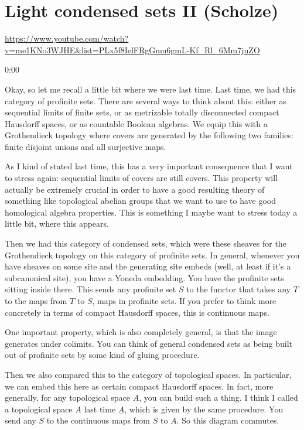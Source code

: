 
\section{\ufs Light condensed sets II (Scholze)}

\url{https://www.youtube.com/watch?v=me1KNo3WJHE&list=PLx5f8IelFRgGmu6gmL-Kf_Rl_6Mm7juZO}
\renewcommand{\yt}[2]{\href{https://www.youtube.com/watch?v=me1KNo3WJHE&list=PLx5f8IelFRgGmu6gmL-Kf_Rl_6Mm7juZO&t=#1}{#2}}
\vspace{1em}

\begin{unfinished}{0:00}

Okay, so let me recall a little bit where we were last time. Last time, we had this category of profinite sets. There are several ways to think about this: either as sequential limits of finite sets, or as metrizable totally disconnected compact Hausdorff spaces, or as countable Boolean algebras. We equip this with a Grothendieck topology where covers are generated by the following two families: finite disjoint unions and all surjective maps.

As I kind of stated last time, this has a very important consequence that I want to stress again: sequential limits of covers are still covers. This property will actually be extremely crucial in order to have a good resulting theory of something like topological abelian groups that we want to use to have good homological algebra properties. This is something I maybe want to stress today a little bit, where this appears.

Then we had this category of condensed sets, which were these sheaves for the Grothendieck topology on this category of profinite sets. In general, whenever you have sheaves on some site and the generating site embeds (well, at least if it's a subcanonical site), you have a Yoneda embedding. You have the profinite sets sitting inside there. This sends any profinite set $S$ to the functor that takes any $T$ to the maps from $T$ to $S$, maps in profinite sets. If you prefer to think more concretely in terms of compact Hausdorff spaces, this is continuous maps.

One important property, which is also completely general, is that the image generates under colimits. You can think of general condensed sets as being built out of profinite sets by some kind of gluing procedure.

Then we also compared this to the category of topological spaces. In particular, we can embed this here as certain compact Hausdorff spaces. In fact, more generally, for any topological space $A$, you can build such a thing. I think I called a topological space $A$ last time $\underline{A}$, which is given by the same procedure. You send any $S$ to the continuous maps from $S$ to $A$. So this diagram commutes.


\end{unfinished}
